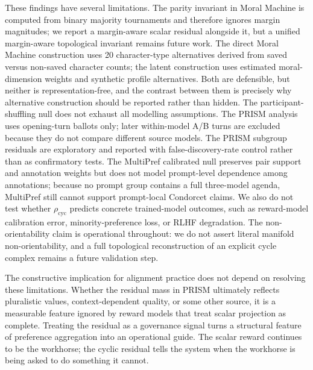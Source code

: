 \documentclass[10pt]{article}
\theoremstyle{definition}
\theoremstyle{remark}
\begin{document}
These findings have several limitations. The parity invariant in Moral Machine is computed from binary majority tournaments and therefore ignores margin magnitudes; we report a margin-aware scalar residual alongside it, but a unified margin-aware topological invariant remains future work. The direct Moral Machine construction uses 20 character-type alternatives derived from saved versus non-saved character counts; the latent construction uses estimated moral-dimension weights and synthetic profile alternatives. Both are defensible, but neither is representation-free, and the contrast between them is precisely why alternative construction should be reported rather than hidden. The participant-shuffling null does not exhaust all modelling assumptions. The PRISM analysis uses opening-turn ballots only; later within-model A/B turns are excluded because they do not compare different source models. The PRISM subgroup residuals are exploratory and reported with false-discovery-rate control rather than as confirmatory tests. The MultiPref calibrated null preserves pair support and annotation weights but does not model prompt-level dependence among annotations; because no prompt group contains a full three-model agenda, MultiPref still cannot support prompt-local Condorcet claims. We also do not test whether $\rho_{\mathrm{cyc}}$ predicts concrete trained-model outcomes, such as reward-model calibration error, minority-preference loss, or RLHF degradation. The non-orientability claim is operational throughout: we do not assert literal manifold non-orientability, and a full topological reconstruction of an explicit cycle complex remains a future validation step.

The constructive implication for alignment practice does not depend on resolving these limitations. Whether the residual mass in PRISM ultimately reflects pluralistic values, context-dependent quality, or some other source, it is a measurable feature ignored by reward models that treat scalar projection as complete. Treating the residual as a governance signal turns a structural feature of preference aggregation into an operational guide. The scalar reward continues to be the workhorse; the cyclic residual tells the system when the workhorse is being asked to do something it cannot.
\end{document}
